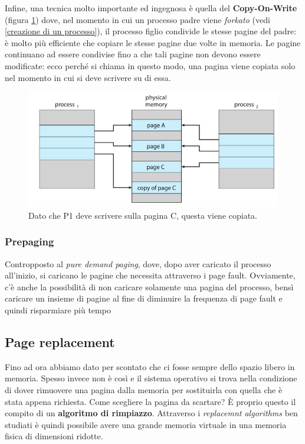 Infine, una tecnica molto importante ed ingegnosa è quella del \textbf{Copy-On-Write} (figura \ref{fig:copy_on_write}) dove, nel momento in cui un processo padre viene \textit{forkato} (vedi \ref{creazione di un processo}), il processo figlio condivide le stesse pagine del padre: è molto più efficiente che copiare le stesse pagine due volte in memoria. Le pagine continuano ad essere condivise fino a che tali pagine non devono essere modificate: ecco perché si chiama in questo modo, una pagina viene copiata solo nel momento in cui si deve scrivere su di essa. 
\begin{figure}[h]
    \centering
    \includegraphics[width = .6\textwidth]{../res/imgs/virtual memory/copy_on_write.png}
    \caption{Dato che P1 deve scrivere sulla pagina C, questa viene copiata.}
    \label{fig:copy_on_write}
\end{figure}

% 
\subsubsection{Prepaging}
Contropposto al \textit{pure demand paging}, dove, dopo aver caricato il processo all'inizio, si caricano le pagine che necessita attraverso i page fault. Ovviamente, c'è anche la possibilità di non caricare solamente una pagina del processo, bensì caricare un insieme di pagine al fine di diminuire la frequenza di page fault e quindi risparmiare più tempo 



% 
\subsection{Page replacement}\label{page replacement}
Fino ad ora abbiamo dato per scontato che ci fosse sempre dello spazio libero in memoria. Spesso invece non è così e il sistema operativo si trova nella condizione di dover rimuovere una pagina dalla memoria per sostituirla con quella che è stata appena richiesta. Come scegliere la pagina da scartare? È proprio questo il compito di un \textbf{algoritmo di rimpiazzo}. Attraverso i \textit{replacemnt algorithms} ben studiati è quindi possibile avere una grande memoria virtuale in una memoria fisica di dimensioni ridotte.

